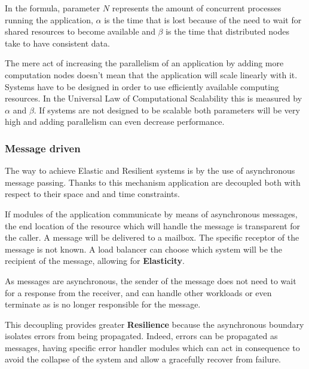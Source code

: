 \documentclass[../main.tex]{subfiles}
\begin{document}
In the formula, parameter $N$ represents the amount of concurrent processes
running the application, $\alpha$ is the time that is lost because of the need
to wait for shared resources to become available and $\beta$ is the time that
distributed nodes take to have consistent data.

The mere act of increasing the parallelism of an application by adding more
computation nodes doesn't mean that the application will scale linearly with it.
Systems have to be designed in order to use efficiently available computing resources.
In the Universal Law of Computational Scalability this is measured by $\alpha$
and $\beta$. If systems are not designed to be scalable both parameters will
be very high and adding parallelism can even decrease performance.

\subsubsection{Message driven}

The way to achieve Elastic and Resilient systems is by the use of asynchronous
message passing. Thanks to this mechanism application are decoupled both with respect to
their space and and time constraints.


If modules of the application communicate by means of asynchronous messages, the end
location of the resource which will handle the message is transparent for the
caller. A message will be delivered to a mailbox. The specific receptor of the
message is not known. A load balancer can choose which system will be the recipient
of the message, allowing for \textbf{Elasticity}.

As messages are asynchronous, the sender of the message does not need to wait for
a response from the receiver, and can handle other workloads or even
terminate as is no longer responsible for the message.

This decoupling provides greater \textbf{Resilience} because the asynchronous
boundary isolates errors from being propagated. Indeed, errors can be propagated
as messages, having specific error handler modules which can act in consequence
to avoid the collapse of the system and allow a gracefully recover from failure.
\end{document}

